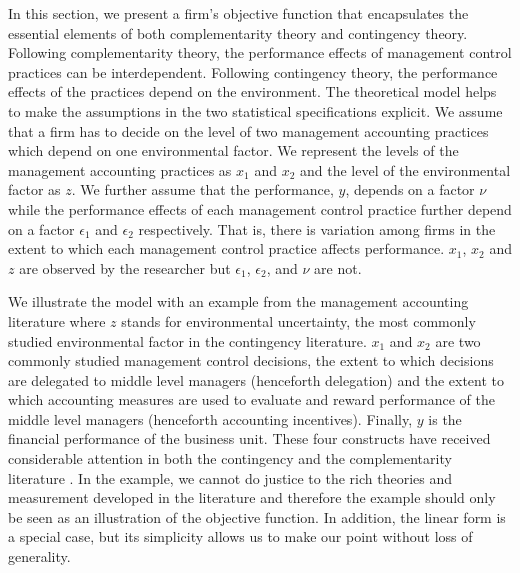 \documentclass[12pt]{article}
\begin{document}
In this section, we present a firm's objective function that encapsulates the essential elements of both complementarity theory and contingency theory. Following complementarity theory, the performance effects of management control practices can be interdependent. Following contingency theory, the performance effects of the practices depend on the environment. The theoretical model helps to make the assumptions in the two statistical specifications explicit. We assume that a firm has to decide on the level of two management accounting practices which depend on one environmental factor. We represent the levels of the management accounting practices as  $x_1$ and $x_2$ and the level of the environmental factor as $z$. We further assume that the performance, $y$, depends on a factor $\nu$ while the performance effects of each management control practice further depend on a factor $\epsilon_1$ and $\epsilon_2$ respectively. That is, there is variation among firms in the extent to which each management control practice affects performance. $x_1$, $x_2$ and $z$ are observed by the researcher but $\epsilon_1$, $\epsilon_2$, and $\nu$ are not. 

We illustrate the model with an example from the management accounting literature where $z$ stands for environmental uncertainty, the most commonly studied environmental factor in the contingency literature. $x_1$ and $x_2$ are two commonly studied management control decisions, the extent to which decisions are delegated to middle level managers (henceforth delegation) and the extent to which accounting measures are used to evaluate and reward performance of the middle level managers (henceforth accounting incentives). Finally, $y$ is the financial performance of the business unit. These four constructs have received considerable attention in both the contingency and the complementarity literature \citep{grabner_management_2013,chenhall_management_2003, otley_contingency_2016}. In the example, we cannot do justice to the rich theories and measurement developed in the literature and therefore the example should only be seen as an illustration of the objective function. In addition, the linear form is a special case, but its simplicity allows us to make our point without loss of generality.
\end{document}
